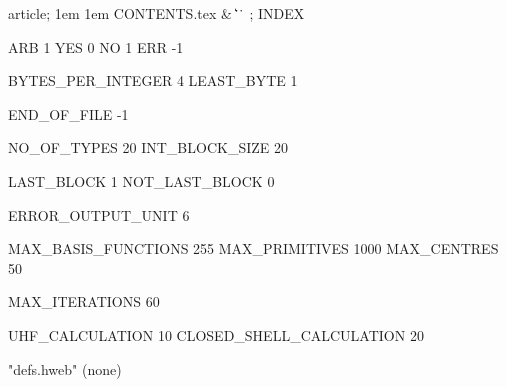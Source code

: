 


\Wbegin[;]
{article;}
{1em}
{1em}
{CONTENTS.tex}
{ %
 {\&\WRS}
 {\|}
 {\>\WUC}
 {\>\WUC}
 {\>\WUC}
 {\@}
 {\.\.}
 {\.}
 {}
}
{\M}
{;}
{INDEX}



 ARB                      1
 YES                      0
 NO                       1
 ERR                     -1

 BYTES_PER_INTEGER        4
 LEAST_BYTE               1

 END_OF_FILE             -1

 NO_OF_TYPES              20
 INT_BLOCK_SIZE           20

 LAST_BLOCK               1
 NOT_LAST_BLOCK           0

 ERROR_OUTPUT_UNIT        6

 MAX_BASIS_FUNCTIONS      255
 MAX_PRIMITIVES           1000
 MAX_CENTRES              50

 MAX_ITERATIONS             60

 UHF_CALCULATION            10
 CLOSED_SHELL_CALCULATION   20

\FWEBtoc




  {"defs.hweb"} {(none)}
 {\Fortran}


\FWEBend
